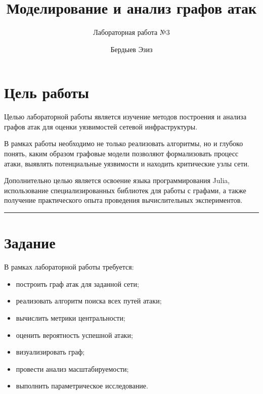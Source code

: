 \documentclass[
  english,
  russian,
  12pt,
  a4paper,
  DIV=11,
  numbers=noendperiod]{scrreprt}
\title{Моделирование и анализ графов атак}
\subtitle{Лабораторная работа №3}
\author{Бердыев Эзиз}
\date{}
\providecommand{\tightlist}{%
  \setlength{\itemsep}{0pt}\setlength{\parskip}{0pt}}
\renewcommand*\contentsname{Содержание}
\newcommand\contentsname{Содержание}
\begin{document}
\maketitle

\renewcommand*\contentsname{Содержание}
{
\setcounter{tocdepth}{2}
\tableofcontents
}
\listoffigures

\chapter{Цель
работы}\label{ux446ux435ux43bux44c-ux440ux430ux431ux43eux442ux44b}

Целью лабораторной работы является изучение методов построения и анализа
графов атак для оценки уязвимостей сетевой инфраструктуры.

В рамках работы необходимо не только реализовать алгоритмы, но и глубоко
понять, каким образом графовые модели позволяют формализовать процесс
атаки, выявлять потенциальные уязвимости и находить критические узлы
сети.

Дополнительно целью является освоение языка программирования Julia,
использование специализированных библиотек для работы с графами, а также
получение практического опыта проведения вычислительных экспериментов.

\begin{center}\rule{0.5\linewidth}{0.5pt}\end{center}

\chapter{Задание}\label{ux437ux430ux434ux430ux43dux438ux435}

В рамках лабораторной работы требуется:

\begin{itemize}
\tightlist
\item
  построить граф атак для заданной сети;
\item
  реализовать алгоритм поиска всех путей атаки;
\item
  вычислить метрики центральности;
\item
  оценить вероятность успешной атаки;
\item
  визуализировать граф;
\item
  провести анализ масштабируемости;
\item
  выполнить параметрическое исследование.
\end{itemize}
\end{document}
